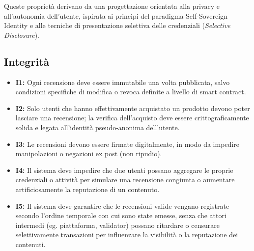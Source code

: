             \noindent Queste proprietà derivano da una progettazione orientata alla privacy e all'autonomia dell'utente, ispirata ai principi del paradigma Self-Sovereign Identity e alle tecniche di presentazione selettiva delle credenziali (\textit{Selective Disclosure}).
                        
        \subsection{Integrità}
            \begin{itemize}
                \item \textbf{I1:} Ogni recensione deve essere immutabile una volta pubblicata, salvo condizioni specifiche di modifica o revoca definite a livello di smart contract.
                
                \item \textbf{I2:} Solo utenti che hanno effettivamente acquistato un prodotto devono poter lasciare una recensione; la verifica dell'acquisto deve essere crittograficamente solida e legata all'identità pseudo-anonima dell'utente.
                
                \item \textbf{I3:} Le recensioni devono essere firmate digitalmente, in modo da impedire manipolazioni o negazioni ex post (non ripudio).
                
                \item \textbf{I4:} Il sistema deve impedire che due utenti possano aggregare le proprie credenziali o attività per simulare una recensione congiunta o aumentare artificiosamente la reputazione di un contenuto.

                \item \textbf{I5:} Il sistema deve garantire che le recensioni valide vengano registrate secondo l'ordine temporale con cui sono state emesse, senza che attori intermedi (eg. piattaforma, validator) possano ritardare o censurare selettivamente transazioni per influenzare la visibilità o la reputazione dei contenuti.
            \end{itemize}
            
